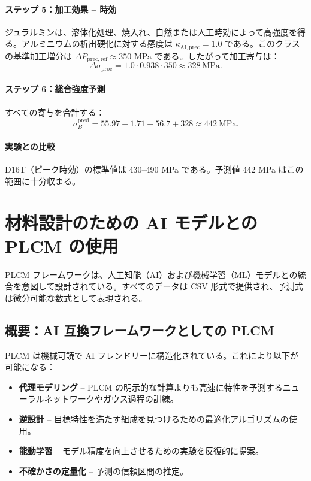 \documentclass[11pt,a4paper]{article}
\theoremstyle{remark}
\begin{document}
	\paragraph{ステップ 5：加工効果 – 時効}
	ジュラルミンは、溶体化処理、焼入れ、自然または人工時効によって高強度を得る。アルミニウムの析出硬化に対する感度は \(\kappa_{\mathrm{Al,prec}}=1.0\) である。このクラスの基準加工増分は \(\Delta P_{\mathrm{prec,ref}}\approx 350\) MPa である。したがって加工寄与は：
	\[
	\Delta\sigma_{\mathrm{proc}} = 1.0\cdot0.938\cdot350 \approx 328\ \text{MPa}.
	\]
	
	\paragraph{ステップ 6：総合強度予測}
	すべての寄与を合計する：
	\[
	\sigma_B^{\mathrm{pred}} = 55.97 + 1.71 + 56.7 + 328 \approx 442\ \text{MPa}.
	\]
	
	\paragraph{実験との比較}
	D16T（ピーク時効）の標準値は 430–490 MPa である。予測値 442 MPa はこの範囲に十分収まる。
	
	\section{材料設計のための AI モデルとの PLCM の使用}
	\label{sec:ai-integration}
	
	PLCM フレームワークは、人工知能（AI）および機械学習（ML）モデルとの統合を意図して設計されている。すべてのデータは CSV 形式で提供され、予測式は微分可能な数式として表現される。
	
	\subsection{概要：AI 互換フレームワークとしての PLCM}
	
	PLCM は機械可読で AI フレンドリーに構造化されている。これにより以下が可能になる：
	\begin{itemize}
		\item \textbf{代理モデリング} – PLCM の明示的な計算よりも高速に特性を予測するニューラルネットワークやガウス過程の訓練。
		\item \textbf{逆設計} – 目標特性を満たす組成を見つけるための最適化アルゴリズムの使用。
		\item \textbf{能動学習} – モデル精度を向上させるための実験を反復的に提案。
		\item \textbf{不確かさの定量化} – 予測の信頼区間の推定。
	\end{itemize}
	
\end{document}
